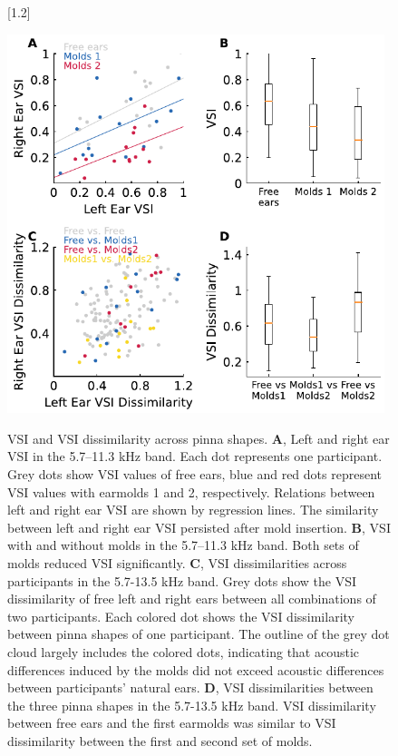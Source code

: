 \begin{figure}[h]
[1.2\FBwidth]
{\caption{VSI and VSI dissimilarity across pinna shapes. \textbf{A}, Left and right ear VSI in the 5.7–11.3 kHz band. Each dot represents one participant. Grey dots show VSI values of free ears, blue and red dots represent VSI values with earmolds 1 and 2, respectively. Relations between left and right ear VSI are shown by regression lines. The similarity between left and right ear VSI persisted after mold insertion. \textbf{B}, VSI with and without molds in the 5.7–11.3 kHz band. Both sets of molds reduced VSI significantly. \textbf{C}, VSI dissimilarities across participants in the 5.7-13.5 kHz band. Grey dots show the VSI dissimilarity of free left and right ears between all combinations of two participants. Each colored dot shows the VSI dissimilarity between pinna shapes of one participant. The outline of the grey dot cloud largely includes the colored dots, indicating that acoustic differences induced by the molds did not exceed acoustic differences between participants' natural ears. \textbf{D}, VSI dissimilarities between the three pinna shapes in the 5.7-13.5 kHz band. VSI dissimilarity between free ears and the first earmolds was similar to VSI dissimilarity between the first and second set of molds.}
\label{fig:molds_vsi}}
{\includegraphics[width=11cm, center]{../Results/figures/fig4/fig4}}
\end{figure}


